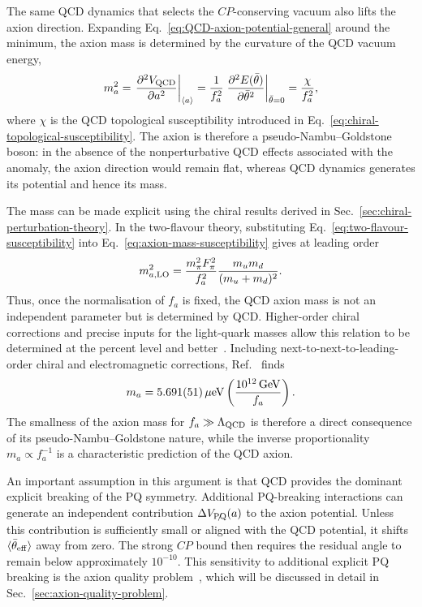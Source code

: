 \documentclass[review]{elsarticle}
\numberwithin{equation}{section}
\numberwithin{table}{section}
\numberwithin{figure}{section}
\begin{document}
The same QCD dynamics that selects the $CP$-conserving vacuum also lifts the axion direction. Expanding Eq.~\eqref{eq:QCD-axion-potential-general} around the minimum, the axion mass is determined by the curvature of the QCD vacuum energy,
\begin{align}
    m_a^2 = \left. \frac{\partial^2V_{\rm QCD}}{\partial a^2}
    \right|_{\langle a\rangle} = \frac{1}{f_a^2}
    \left. \frac{\partial^2E(\bar\theta)}{\partial\bar\theta^2}
    \right|_{\bar\theta=0} = \frac{\chi}{f_a^2},
    \label{eq:axion-mass-susceptibility}
\end{align}
where $\chi$ is the QCD topological susceptibility introduced in Eq.~\eqref{eq:chiral-topological-susceptibility}. The axion is therefore a pseudo-Nambu--Goldstone boson: in the absence of the nonperturbative QCD effects associated with the anomaly, the axion direction would remain flat, whereas QCD dynamics generates its potential and hence its mass.

The mass can be made explicit using the chiral results derived in Sec.~\ref{sec:chiral-perturbation-theory}. In the two-flavour theory, substituting Eq.~\eqref{eq:two-flavour-susceptibility} into Eq.~\eqref{eq:axion-mass-susceptibility} gives at leading order
\begin{align}
    m_{a,{\rm LO}}^2 = \frac{m_\pi^2F_\pi^2}{f_a^2} \frac{m_um_d}{(m_u+m_d)^2}.
    \label{eq:axion-mass-LO}
\end{align}
Thus, once the normalisation of $f_a$ is fixed, the QCD axion mass is not an independent parameter but is determined by QCD. Higher-order chiral corrections and precise inputs for the light-quark masses allow this relation to be determined at the percent level and better~\cite{GrilliDiCortona:2015jxo,Gorghetto:2018ocs}. Including next-to-next-to-leading-order chiral and electromagnetic corrections, Ref.~\cite{Gorghetto:2018ocs} finds
\begin{align}
    m_a = 5.691(51)\,\mu{\rm eV}
    \left(\frac{10^{12}\,{\rm GeV}}{f_a} \right).
    \label{eq:axion-mass-numerical}
\end{align}
The smallness of the axion mass for $f_a\gg\Lambda_{\rm QCD}$ is therefore a direct consequence of its pseudo-Nambu--Goldstone nature, while the inverse proportionality $m_a\propto f_a^{-1}$ is a characteristic prediction of the QCD axion.

An important assumption in this argument is that QCD provides the dominant explicit breaking of the PQ symmetry. Additional PQ-breaking interactions can generate an independent contribution $\Delta V_{\slashed{\rm PQ}}(a)$ to the axion potential. Unless this contribution is sufficiently small or aligned with the QCD potential, it shifts $\langle\bar\theta_{\rm eff}\rangle$ away from zero. The strong $CP$ bound then requires the residual angle to remain below approximately $10^{-10}$. This sensitivity to additional explicit PQ breaking is the axion quality problem~\cite{Barr:1992qq,Holman:1992us,Kamionkowski:1992mf}, which will be discussed in detail in Sec.~\ref{sec:axion-quality-problem}.
\end{document}
